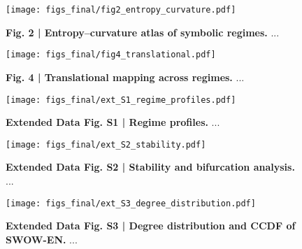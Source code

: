 
\begin{figure}[t]
  \centering
  \texttt{[image: figs\_final/fig2\_entropy\_curvature.pdf]}
  \caption{\textbf{Fig. 2 | Entropy–curvature atlas of symbolic regimes.} ...}
  \label{fig:fig2_entropy_curvature}
\end{figure}

\begin{figure}[t]
  \centering
  \texttt{[image: figs\_final/fig4\_translational.pdf]}
  \caption{\textbf{Fig. 4 | Translational mapping across regimes.} ...}
  \label{fig:fig4_translational}
\end{figure}

\begin{figure}[t]
  \centering
  \texttt{[image: figs\_final/ext\_S1\_regime\_profiles.pdf]}
  \caption{\textbf{Extended Data Fig. S1 | Regime profiles.} ...}
  \label{fig:ext_s1_profiles}
\end{figure}

\begin{figure}[t]
  \centering
  \texttt{[image: figs\_final/ext\_S2\_stability.pdf]}
  \caption{\textbf{Extended Data Fig. S2 | Stability and bifurcation analysis.} ...}
  \label{fig:ext_s2_stability}
\end{figure}

\begin{figure}[t]
  \centering
  \texttt{[image: figs\_final/ext\_S3\_degree\_distribution.pdf]}
  \caption{\textbf{Extended Data Fig. S3 | Degree distribution and CCDF of SWOW-EN.} ...}
  \label{fig:ext_s3_degree}
\end{figure}
